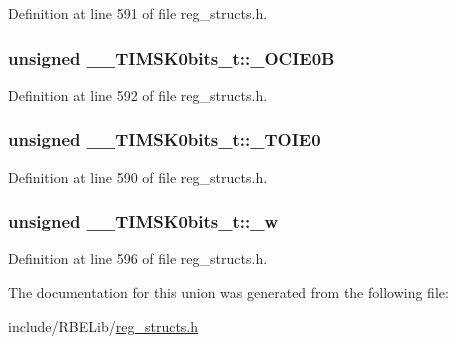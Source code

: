 Definition at line 591 of file reg\+\_\+structs.\+h.

\hypertarget{union_____t_i_m_s_k0bits__t_a6e63954cfe1eaedde9ce1d61d64e4d61}{
\subsubsection[{\+\_\+\+O\+C\+I\+E0\+B}]{\setlength{\rightskip}{0pt plus 5cm}unsigned \+\_\+\+\_\+\+T\+I\+M\+S\+K0bits\+\_\+t\+::\+\_\+\+O\+C\+I\+E0\+B}}\label{union_____t_i_m_s_k0bits__t_a6e63954cfe1eaedde9ce1d61d64e4d61}


Definition at line 592 of file reg\+\_\+structs.\+h.

\hypertarget{union_____t_i_m_s_k0bits__t_a324d02df4480383ae3a9863edd479ed3}{
\subsubsection[{\+\_\+\+T\+O\+I\+E0}]{\setlength{\rightskip}{0pt plus 5cm}unsigned \+\_\+\+\_\+\+T\+I\+M\+S\+K0bits\+\_\+t\+::\+\_\+\+T\+O\+I\+E0}}\label{union_____t_i_m_s_k0bits__t_a324d02df4480383ae3a9863edd479ed3}


Definition at line 590 of file reg\+\_\+structs.\+h.

\hypertarget{union_____t_i_m_s_k0bits__t_a03c5af0ecd57a12c9d94b19451d2b6c8}{
\subsubsection[{\+\_\+w}]{\setlength{\rightskip}{0pt plus 5cm}unsigned \+\_\+\+\_\+\+T\+I\+M\+S\+K0bits\+\_\+t\+::\+\_\+w}}\label{union_____t_i_m_s_k0bits__t_a03c5af0ecd57a12c9d94b19451d2b6c8}


Definition at line 596 of file reg\+\_\+structs.\+h.



The documentation for this union was generated from the following file\+:\begin{DoxyCompactItemize}
\item 
include/\+R\+B\+E\+Lib/\hyperlink{reg__structs_8h}{reg\+\_\+structs.\+h}\end{DoxyCompactItemize}
